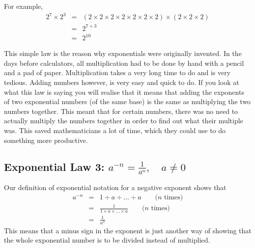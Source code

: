 \documentclass[10pt,a4paper,titlepage,twoside,openright]{report}
\begin{document}
For example,
\begin{eqnarray*}
2^7\times2^3&=&(2\times 2\times 2\times 2\times 2\times 2\times 2)\times(2\times 2\times 2)\\
&=&2^{7+3}\\
&=&2^{10}
\end{eqnarray*}

\begin{IFact}
{This simple law is the reason why exponentials were originally invented. In the days before calculators, all multiplication had to be done by hand with a pencil and a pad of paper. Multiplication takes a very long time to do and is very tedious. Adding numbers however, is very easy and quick to do. If you look at what this law is saying you will realise that it means that adding the exponents of two exponential numbers (of the same base) is the same as multiplying the two numbers together. This meant that for certain numbers, there was no need to actually multiply the numbers together in order to find out what their multiple was. This saved mathematicians a lot of time, which they could use to do something more productive.}
\end{IFact}


\subsection{Exponential Law 3: $a^{-n}=\frac{1}{a^{n}},\quad a\neq 0 $}
Our definition of exponential notation for a negative exponent shows that
\begin{eqnarray}
\label{eq:mn:e:law3:proof}
a^{-n}&=&1\div a\div\ldots\div a\qquad\textrm{(}n
\textrm{ times)}\\\nonumber
&=&\frac 1{1\times a\times\dots\times a}\qquad\textrm{(}n
\textrm{ times)}\\\nonumber
&=&\frac 1{a^n}
\end{eqnarray}
This means that a minus sign in the exponent is just another way of showing that the whole exponential number is to be divided instead of multiplied.
\end{document}
